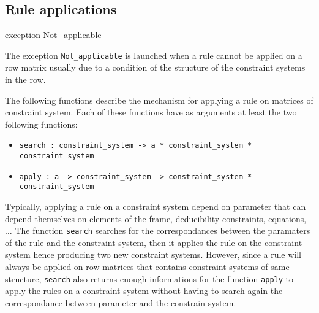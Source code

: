 \subsection{Rule applications}




\label{exception:Constraint-underscoresystem.Not-underscoreapplicable}\begin{ocamldoccode}
exception Not_applicable
\end{ocamldoccode}
\begin{ocamldocdescription}
The exception {\tt{Not\_applicable}} is launched when a rule cannot be applied on a row matrix
    usually due to a condition of the structure of the constraint systems in the row.


\end{ocamldocdescription}




The following functions describe the mechanism for applying a rule on matrices of
    constraint system. Each of these functions have as arguments at least the two following functions:
    \begin{itemize}
\item {\tt{search : constraint\_system -> {\textquotesingle}a * constraint\_system * constraint\_system}}
\item {\tt{apply : {\textquotesingle}a -> constraint\_system -> constraint\_system * constraint\_system}}
\end{itemize}

    Typically, applying a rule on a constraint system depend on parameter that can depend themselves on
    elements of the frame, deducibility constraints, equations, $\ldots$ The function {\tt{search}} searches
    for the correspondances between the paramaters of the rule and the constraint system, then it applies 
    the rule on the constraint system hence producing two new constraint systems. However, since a rule will 
    always be applied on row matrices that contains constraint systems of same structure, {\tt{search}} also
    returns enough informations for the function {\tt{apply}} to apply the rules on a constraint system without 
    having to search again the correspondance between parameter and the constrain system.


    \medskip 



